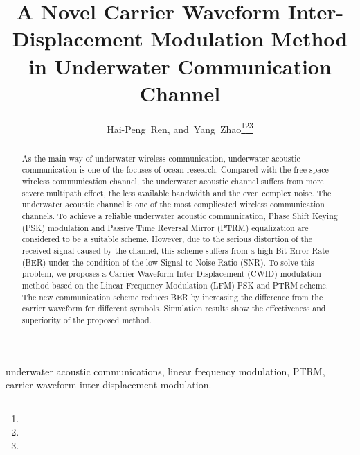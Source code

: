\documentclass[journal]{IEEEtran}
\begin{document}
\title{A Novel Carrier Waveform Inter-Displacement Modulation Method in Underwater Communication Channel}

\author{Hai-Peng~Ren,{}
        and~Yang~Zhao{}\thanks{}\thanks{}\thanks{}}















\maketitle

\begin{abstract}
As the main way of underwater wireless communication, underwater
acoustic communication is one of the focuses of ocean research.
Compared with the free space wireless communication channel, the
underwater acoustic channel suffers from more severe multipath
effect, the less available bandwidth and the even complex noise. The
underwater acoustic channel is one of the most complicated wireless
communication channels. To achieve a reliable underwater acoustic
communication, Phase Shift Keying (PSK) modulation and Passive Time
Reversal Mirror (PTRM) equalization are considered to be a suitable
scheme. However, due to the serious distortion of the received
signal caused by the channel, this scheme suffers from a high Bit
Error Rate (BER) under the condition of the low Signal to Noise
Ratio (SNR). To solve this problem, we proposes a Carrier Waveform
Inter-Displacement (CWID) modulation method based on the Linear
Frequency Modulation (LFM) PSK and PTRM scheme. The new
communication scheme reduces BER by increasing the difference from
the carrier waveform for different symbols. Simulation results show
the effectiveness and superiority of the proposed method.
\end{abstract}

\begin{IEEEkeywords}
underwater acoustic communications, linear frequency modulation,
PTRM, carrier waveform inter-displacement modulation.
\end{IEEEkeywords}






\IEEEpeerreviewmaketitle
\end{document}
